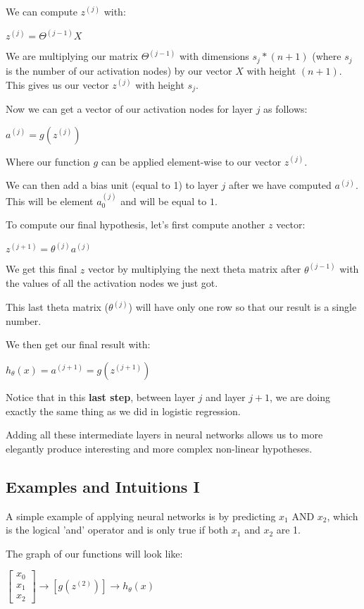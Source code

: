 \documentclass{article}
\begin{document}
We can compute $z^{(j)}$ with:

$z^{(j)}=\Theta^{(j−1)}X$

We are multiplying our matrix $\Theta^{(j−1)}$ with dimensions $s_j*(n+1)$ (where $s_j$ is the number of our activation nodes) by our vector $X$ with height $(n+1)$. This gives us our vector $z^{(j)}$ with height $s_j$.

Now we can get a vector of our activation nodes for layer $j$ as follows:

$a^{(j)}=g(z^{(j)})$

Where our function $g$ can be applied element-wise to our vector $z^{(j)}$.

We can then add a bias unit (equal to 1) to layer $j$ after we have computed $a^{(j)}$. This will be element $a_0^{(j)}$ and will be equal to $1$.

To compute our final hypothesis, let's first compute another $z$ vector:

$z^{(j+1)}=\theta^{(j)}a^{(j)}$

We get this final $z$ vector by multiplying the next theta matrix after $\theta^{(j−1)}$ with the values of all the activation nodes we just got.

This last theta matrix ($\theta^{(j)}$) will have only one row so that our result is a single number.

We then get our final result with:

$h_\theta(x)=a^{(j+1)}=g(z^{(j+1)})$

Notice that in this \textbf{last step}, between layer $j$ and layer $j+1$, we are doing exactly the same thing as we did in logistic regression.

Adding all these intermediate layers in neural networks allows us to more elegantly produce interesting and more complex non-linear hypotheses.
\subsection{Examples and Intuitions I}

A simple example of applying neural networks is by predicting $x_1$ AND $x_2$, which is the logical 'and' operator and is only true if both $x_1$ and $x_2$ are 1.

The graph of our functions will look like:

$\begin{bmatrix}
x_0 \\
x_1 \\
x_2
\end{bmatrix}
\to
\left[g(z^{(2)}) \right]
\to 
h_{\theta}(x)
$
\end{document}
